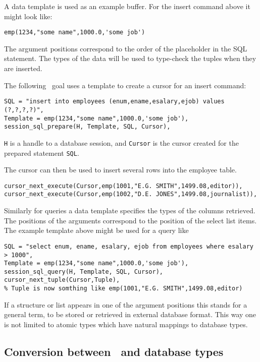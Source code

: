 A data template is used as an example buffer. For the insert command above it
might look like:

\begin{verbatim}
emp(1234,"some name",1000.0,'some job')
\end{verbatim}

The argument positions correspond to the order of the placeholder in the
SQL statement.
The types of the data will be used to type-check the tuples when they
are inserted.

The following \eclipse\ goal uses a template to create a cursor for an insert
command:
\begin{verbatim}
SQL = "insert into employees (enum,ename,esalary,ejob) values (?,?,?,?)",
Template = emp(1234,"some name",1000.0,'some job'),
session_sql_prepare(H, Template, SQL, Cursor),
\end{verbatim}
\verb'H' is a handle to a database session, and \verb'Cursor' is the cursor
created for the prepared statement \verb'SQL'.

The cursor can then be used to insert several rows into the employee table.

\begin{verbatim}
cursor_next_execute(Cursor,emp(1001,"E.G. SMITH",1499.08,editor)),
cursor_next_execute(Cursor,emp(1002,"D.E. JONES",1499.08,journalist)),
\end{verbatim}

Similarly for queries a data template specifies the types of the
columns retrieved. The positions of the arguments correspond to
the position of the select list items. The example template above
might be used for a query like

\begin{verbatim}
SQL = "select enum, ename, esalary, ejob from employees where esalary > 1000",
Template = emp(1234,"some name",1000.0,'some job'),
session_sql_query(H, Template, SQL, Cursor),
cursor_next_tuple(Cursor,Tuple),
% Tuple is now somthing like emp(1001,"E.G. SMITH",1499.08,editor)
\end{verbatim}

If a structure or list appears in
one of the argument positions this stands for a general term, to
be stored or retrieved in external database format. This way one is not
limited to atomic types which have natural mappings to database types.

\subsection{Conversion between \eclipse\ and database types}

